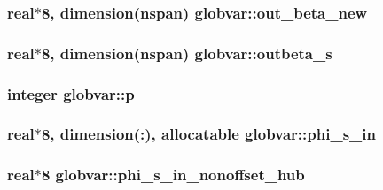 \subsubsection[{out\+\_\+beta\+\_\+new}]{\setlength{\rightskip}{0pt plus 5cm}real$\ast$8, dimension({\bf nspan}) globvar\+::out\+\_\+beta\+\_\+new}\label{namespaceglobvar_a07729166d5dd2b6a73e99fa9f7f4c3fc}
\hypertarget{namespaceglobvar_a7c178a712e3c274e2a3496efbea3f9e7}{}
\subsubsection[{outbeta\+\_\+s}]{\setlength{\rightskip}{0pt plus 5cm}real$\ast$8, dimension({\bf nspan}) globvar\+::outbeta\+\_\+s}\label{namespaceglobvar_a7c178a712e3c274e2a3496efbea3f9e7}
\hypertarget{namespaceglobvar_ae7c4dc9c253893de2f413b45f223f1a9}{}
\subsubsection[{p}]{\setlength{\rightskip}{0pt plus 5cm}integer globvar\+::p}\label{namespaceglobvar_ae7c4dc9c253893de2f413b45f223f1a9}
\hypertarget{namespaceglobvar_afc0c5598225e6044c065125b3a4abb11}{}
\subsubsection[{phi\+\_\+s\+\_\+in}]{\setlength{\rightskip}{0pt plus 5cm}real$\ast$8, dimension(\+:), allocatable globvar\+::phi\+\_\+s\+\_\+in}\label{namespaceglobvar_afc0c5598225e6044c065125b3a4abb11}
\hypertarget{namespaceglobvar_a1f20572185fb4ba6325b2158c570f2b8}{}
\subsubsection[{phi\+\_\+s\+\_\+in\+\_\+nonoffset\+\_\+hub}]{\setlength{\rightskip}{0pt plus 5cm}real$\ast$8 globvar\+::phi\+\_\+s\+\_\+in\+\_\+nonoffset\+\_\+hub}\label{namespaceglobvar_a1f20572185fb4ba6325b2158c570f2b8}
\hypertarget{namespaceglobvar_a9a3ae0b7ec948af43ece3fee824e7da2}{}

